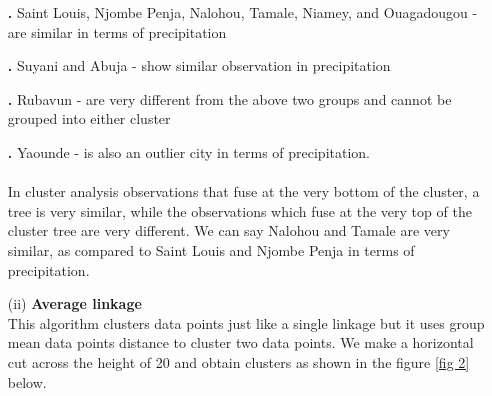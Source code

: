 \documentclass[12pt,a4paper]{article}
\begin{document}
\begin{enumerate}
\item[\textbf{.}]Saint Louis, Njombe Penja, Nalohou, Tamale, Niamey, and Ouagadougou - are similar in terms of precipitation
\item[\textbf{.}]Suyani and Abuja - show similar observation in precipitation
\item[\textbf{.}]Rubavun - are very different from the above two groups and cannot be grouped into either cluster 
\item[\textbf{.}] Yaounde - is also an outlier city in terms of precipitation.\\ \\
In cluster analysis observations that fuse at the very bottom of the cluster, a tree is very similar, while the observations which fuse at the very top of the cluster tree are very different. We can say Nalohou and Tamale are very similar, as compared to Saint Louis and Njombe Penja in terms of precipitation.

\item[(ii)]
\textbf{Average linkage}\\
This algorithm clusters data points just like a single linkage but it uses group mean data points distance to cluster two data points. We make a horizontal cut across the height of 20 and obtain clusters as shown in the figure \ref{fig 2} below.


\end{enumerate}
\end{document}
